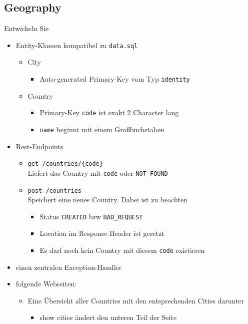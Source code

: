 \subsection{Geography}
Entwickeln Sie
\begin{itemize}
	\item Entity-Klassen kompatibel zu \texttt{data.sql}
	\begin{itemize}
		\item City 
		\begin{itemize}
			\item Auto-generated Primary-Key vom Typ \texttt{identity} 
		\end{itemize}
		\item Country
		\begin{itemize}
			\item Primary-Key \texttt{code} ist exakt 2 Character lang
			\item \texttt{name} beginnt mit einem Großbuchstaben
		\end{itemize}
	\end{itemize}
	\item Rest-Endpoints
	\begin{itemize}
		\item \texttt{get /countries/\{code\}}\\
		Liefert das Country mit \texttt{code} oder \texttt{NOT\_FOUND}
		\item \texttt{post /countries}\\
		Speichert eine neues Country. Dabei ist zu beachten
		\begin{itemize}
			\item Status \texttt{CREATED} bzw \texttt{BAD\_REQUEST}
			\item Location im Response-Header ist gesetzt
			\item Es darf noch kein Country mit diesem \texttt{code} existieren
		\end{itemize}
	\end{itemize}
	\item einen zentralen Exception-Handler
	\item folgende Webseiten:
	\begin{itemize}
		\item Eine Übersicht aller Countries mit den entsprechenden Cities darunter
		\begin{itemize}
			\item show cities ändert den unteren Teil der Seite
		\end{itemize}

\end{itemize}
\end{itemize}
